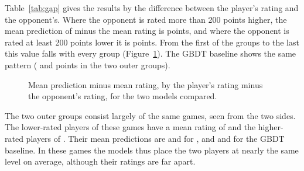 \documentclass[11pt]{article}
\begin{document}
Table~\ref{tab:gap} gives the results by the difference between the player's
rating and the opponent's. Where the opponent is rated more than 200 points
higher, the mean prediction of  minus the mean rating is
 points, and where the opponent is rated at
least 200 points lower it is  points. From
the first of the  groups to the last this value falls
with every group (Figure~\ref{fig:gap-bias}). The GBDT baseline shows the
same pattern ( and
 points in the two outer groups).

\begin{table}[htbp]\centering\footnotesize
{}
\caption{Test-set results by the player's rating minus the opponent's
rating. For each group: the number of test examples, the mean rating, the
mean prediction and MAE of each of the two models, and the paired gain of the
first model over the second.}
\label{tab:gap}
\end{table}

\begin{figure}[htbp]\centering
{}
\caption{Mean prediction minus mean rating, by the player's rating minus the
opponent's rating, for the two models compared.}
\label{fig:gap-bias}
\end{figure}

The two outer groups consist largely of the same games, seen from the two
sides. The lower-rated players of these games have a mean rating of
 and the higher-rated players of
. Their mean predictions are
 and 
for , and  and
 for the GBDT baseline. In these games the
models thus place the two players at nearly the same level on average,
although their ratings are far apart.
\end{document}

